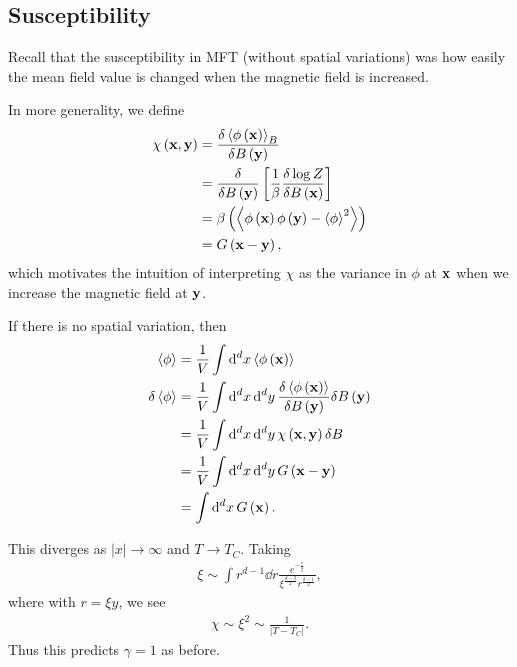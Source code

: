 \subsection{Susceptibility}

Recall that the susceptibility in MFT (without spatial variations) was how easily the mean field value is changed when the magnetic field is increased. 

In more generality, we define
\begin{align}
    \chi \left( \vb{x},\vb{y} \right) &= \fdv{\left<\phi \left( \vb{x} \right)  \right>_B}{B\left( \vb{y} \right) } \\
                                     &= \fdv{B \left( \vb{y} \right) } \left[ \frac{1}{\beta} \fdv{\log Z}{B \left( \vb{x} \right) } \right]  \\
                                     &= \beta \left( \left<\phi \left( \vb{x} \right) \phi \left( \vb{y} \right) - \left<\phi \right>^2 \right> \right)  \\
                                     &= G \left( \vb{x} - \vb{y} \right)
,\end{align}
which motivates the intuition of interpreting $\chi$ as the variance in $\phi$ at $\vb{x}$ when we increase the magnetic field at $\vb{y}$.

If there is no spatial variation, then
\begin{align}
    \left<\phi \right> &= \frac{1}{V} \int \dd{^{d}x} \left<\phi \left( \vb{x} \right)  \right> \\
    \delta \left<\phi \right> &= \frac{1}{V} \int \dd{^{d}x} \dd{^{d}y} \fdv{\left<\phi \left( \vb{x} \right)  \right>}{B\left( \vb{y} \right) } \delta B \left( \vb{y} \right)  \\
    &= \frac{1}{V} \int \dd{^{d}x} \dd{^{d}y} \chi \left( \vb{x}, \vb{y} \right) \delta B \\
    &= \frac{1}{V} \int \dd{^{d}x} \dd{^{d}y} G \left( \vb{x} - \vb{y} \right)  \\
    &= \int \dd{^{d}x} G \left( \vb{x} \right)
.\end{align}

This diverges as $\left| x \right| \to \infty$ and $T \to T_C$. Taking
\begin{align}
    \xi \sim  \int r^{d -1} \dd{r} \frac{e^{-\frac{r}{\xi}}}{\xi^{\frac{d-3}{2}} r^{\frac{d-1}{2}}}
,\end{align}
where with $r = \xi y$, we see
\begin{align}
    \chi \sim \xi^2 \sim  \frac{1}{\left| T - T_C \right| }
.\end{align}
Thus this predicts $\gamma = 1$ as before.





